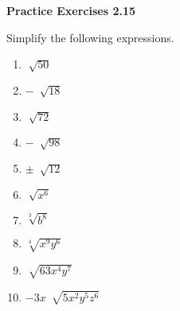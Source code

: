 \vspace{0.3ex}
\noindent\textbf{Practice Exercises 2.15}

\vspace{0.2ex}

Simplify the following expressions.

\begin{multicols}{2}
\begin{enumerate}[noitemsep, label = \color{blue}\arabic*. ]
    \item $\sqrt[]{50}$
    \item $-~\sqrt[]{18}$
    \item $\sqrt[]{72}$
    \item $-~\sqrt[]{98}$
    \item $\pm~\sqrt[]{12}$
    \item $\sqrt[]{x^{6}}$
    \item $\sqrt[{\scriptstyle 3}]{b^{8}}$
    \item $\sqrt[{\scriptstyle 4}]{x^{9}y^{6}}$
    \item $\sqrt[]{63 x^{4}y^{7}}$
    \item $-3x~\sqrt[]{5x^2 y^{5}z^{6}}$
\end{enumerate}
\end{multicols}

